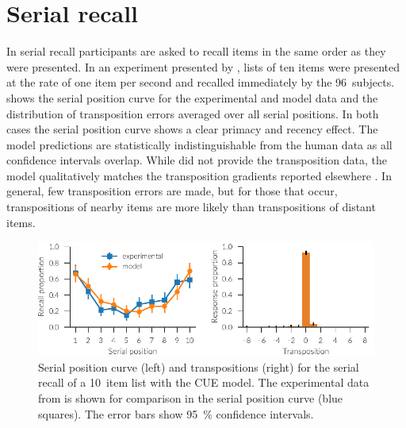 \section{Serial recall}
In serial recall participants are asked to recall items in the same order as they were presented.
In an experiment presented by \textcite{Jahnke1968}, lists of ten items were presented at the rate of one item per second and recalled immediately by the \num{96}~subjects.
 shows the serial position curve for the experimental and model data and the distribution of transposition errors averaged over all serial positions.
In both cases the serial position curve shows a clear primacy and recency effect.
The model predictions are statistically indistinguishable from the human data as all confidence intervals overlap.
While \textcite{Jahnke1968} did not provide the transposition data, the model qualitatively matches the transposition gradients reported elsewhere \parencite[e.g.,][]{Henson1996}.
In general, few transposition errors are made, but for those that occur, transpositions of nearby items are more likely than transpositions of distant items.
\begin{figure}
    \centering
    \includegraphics{figures/results/serial}
    \caption[Serial position curve and transpositions for serial recall with the CUE model.]{Serial position curve (left) and transpositions (right) for the serial recall of a \num{10}~item list with the CUE model. The experimental data from \textcite{Jahnke1968} is shown for comparison in the serial position curve (blue squares). The error bars show \SI{95}{\percent} confidence intervals.}\label{fig:results-serial}
\end{figure}

